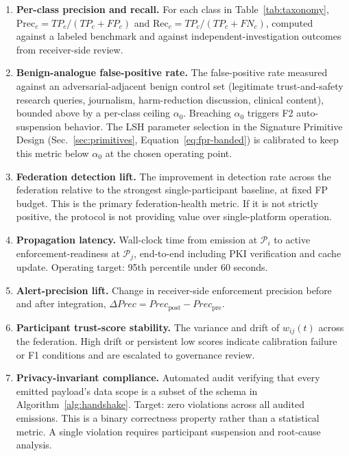 \documentclass[11pt]{article}
\begin{document}
\begin{enumerate}[label=(M\arabic*), leftmargin=2.4em]
\item \textbf{Per-class precision and recall.} For each class in Table~\ref{tab:taxonomy}, $\mathrm{Prec}_c = TP_c / (TP_c + FP_c)$ and $\mathrm{Rec}_c = TP_c / (TP_c + FN_c)$, computed against a labeled benchmark and against independent-investigation outcomes from receiver-side review.

\item \textbf{Benign-analogue false-positive rate.} The false-positive rate measured against an adversarial-adjacent benign control set (legitimate trust-and-safety research queries, journalism, harm-reduction discussion, clinical content), bounded above by a per-class ceiling $\alpha_0$. Breaching $\alpha_0$ triggers F2 auto-suspension behavior. The LSH parameter selection in the Signature Primitive Design (Sec.~\ref{sec:primitives}, Equation~\eqref{eq:fpr-banded}) is calibrated to keep this metric below $\alpha_0$ at the chosen operating point.

\item \textbf{Federation detection lift.} The improvement in detection rate across the federation relative to the strongest single-participant baseline, at fixed FP budget. This is the primary federation-health metric. If it is not strictly positive, the protocol is not providing value over single-platform operation.

\item \textbf{Propagation latency.} Wall-clock time from emission at $\mathcal{P}_i$ to active enforcement-readiness at $\mathcal{P}_j$, end-to-end including PKI verification and cache update. Operating target: 95th percentile under 60 seconds.

\item \textbf{Alert-precision lift.} Change in receiver-side enforcement precision before and after integration, $\Delta\mathit{Prec} = \mathit{Prec}_\mathrm{post} - \mathit{Prec}_\mathrm{pre}$.

\item \textbf{Participant trust-score stability.} The variance and drift of $w_{ij}(t)$ across the federation. High drift or persistent low scores indicate calibration failure or F1 conditions and are escalated to governance review.

\item \textbf{Privacy-invariant compliance.} Automated audit verifying that every emitted payload's data scope is a subset of the schema in Algorithm~\ref{alg:handshake}. Target: zero violations across all audited emissions. This is a binary correctness property rather than a statistical metric. A single violation requires participant suspension and root-cause analysis.


\end{enumerate}
\end{document}
